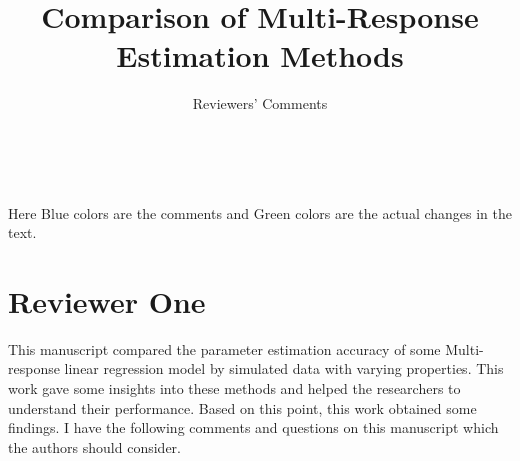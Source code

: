 \documentclass[11pt, a4paper]{article}
\title{Comparison of Multi-Response Estimation Methods}
\subtitle{Reviewers' Comments}
\makeatletter
\renewcommand{\maketitle}{
    \begin{minipage}[t][3cm][b]{\textwidth}
        \raggedright
        \LARGE \@title \\
        \large \@subtitle
    \end{minipage}
}
\makeatother
\begin{document}
\maketitle

\thispagestyle{empty}
\vspace{1em}

Here \textcolor{mycolor1}{Blue} colors are the comments and
\textcolor{answers}{Green} colors are the actual changes in the text.

\section{Reviewer One}

This manuscript compared the parameter estimation accuracy of some Multi-response linear regression model by simulated data with varying properties. This work gave some insights into these methods and helped the researchers to understand their performance. Based on this point, this work obtained some findings. I have the following comments and questions on this manuscript which the authors should consider.
\end{document}
